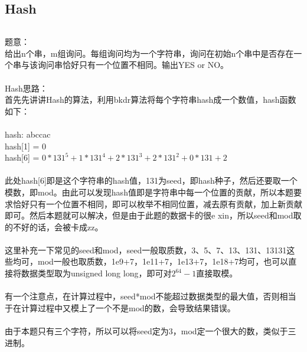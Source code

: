 \documentclass[twoside]{article}
\begin{document}
\subsection{Hash}
\begin{lstlisting}
\end{lstlisting}
题意：\\
给出n个串，m组询问。每组询问均为一个字符串，询问在初始n个串中是否存在一个串与该询问串恰好只有一个位置不相同。输出YES or NO。\\
\\
Hash思路：\\
首先先讲讲Hash的算法，利用bkdr算法将每个字符串hash成一个数值，hash函数如下：\\
\\
hash: abccac\\
hash[1] = 0\\
hash[6] = $0*131^5+1*131^4+2*131^3+2*131^2+0*131+2$\\
\\
此处hash[6]即是这个字符串的hash值，131为seed，即hash种子，然后还要取一个模数，即mod。由此可以发现hash值即是字符串中每一个位置的贡献，所以本题要求恰好只有一个位置不相同，即可以枚举不相同位置，减去原有贡献，加上新贡献即可。然后本题就可以解决，但是由于此题的数据卡的很e xin，所以seed和mod取的不好的话，会被卡成zz。\\
\\
这里补充一下常见的seed和mod，seed一般取质数，3、5、7、13、131、13131这些均可，mod一般也取质数，1e9+7，1e11+7，1e13+7，1e18+7均可，也可以直接将数据类型取为unsigned long long，即可对$2^64-1$直接取模。\\
\\
有一个注意点，在计算过程中，seed*mod不能超过数据类型的最大值，否则相当于在计算过程中又模上了一个不是mod的数，会导致结果错误。\\
\\
由于本题只有三个字符，所以可以将seed定为3，mod定一个很大的数，类似于三进制。\\
\end{document}
